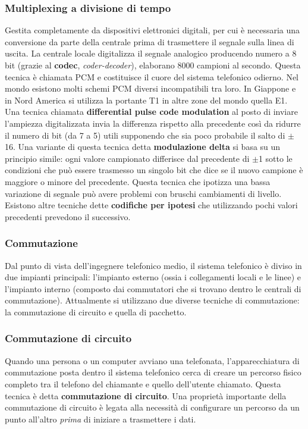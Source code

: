 \subsubsection*{Multiplexing a divisione di tempo}

Gestita completamente da dispositivi elettronici digitali, per cui è necessaria una conversione da parte della centrale prima di trasmettere il segnale sulla linea di uscita. La centrale locale digitalizza il segnale analogico producendo numero a 8 bit (grazie al \textbf{codec}, \textit{coder-decoder}), elaborano  8000 campioni al secondo. Questa tecnica è chiamata PCM e costituisce il cuore del sistema telefonico odierno. Nel mondo esistono molti schemi PCM diversi incompatibili tra loro. In Giappone e in Nord America si utilizza la portante T1 in altre zone del mondo quella E1. Una tecnica chiamata \textbf{differential pulse code modulation} al posto di inviare l'ampiezza digitalizzata invia la differenza rispetto alla precedente così da ridurre il numero di bit (da 7 a 5) utili supponendo che sia poco probabile il salto di \(\pm\)16. Una variante di questa tecnica detta \textbf{modulazione delta} si basa su un principio simile: ogni valore campionato differisce dal precedente di \(\pm\)1 sotto le condizioni che può essere trasmesso un singolo bit che dice se il nuovo campione è maggiore o minore del precedente. Questa tecnica che ipotizza una bassa variazione di segnale può avere problemi con bruschi cambiamenti di livello. Esistono altre tecniche dette \textbf{codifiche per ipotesi} che utilizzando pochi valori precedenti prevedono il successivo.

\subsubsection{Commutazione}

Dal punto di vista dell'ingegnere telefonico medio, il sistema telefonico è diviso in due impianti principali: l'impianto esterno (ossia i collegamenti locali e le linee) e l'impianto interno (composto dai commutatori che si trovano dentro le centrali di commutazione).
Attualmente si utilizzano due diverse tecniche di commutazione: la commutazione di circuito e quella di pacchetto.

\subsubsection*{Commutazione di circuito}

Quando una persona o un computer avviano una telefonata, l'apparecchiatura di commutazione posta dentro il sistema telefonico cerca di creare un percorso fisico completo tra il telefono del chiamante e quello dell'utente chiamato. Questa tecnica è detta \textbf{commutazione di circuito}. Una proprietà importante della commutazione di circuito è legata alla necessità di configurare un percorso da un punto all'altro \textit{prima} di iniziare a trasmettere i dati.

